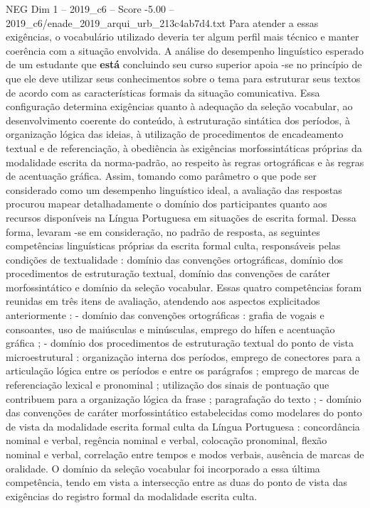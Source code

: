 \begin{textsample}{NEG Dim 1 – 2019\_c6 – Score -5.00 – 2019\_c6/enade\_2019\_arqui\_urb\_213c4ab7d4.txt}
Para atender a essas exigências, o vocabulário utilizado deveria ter algum perfil mais técnico e manter coerência com a situação envolvida.
A análise do desempenho linguístico esperado de um estudante que \textbf{está} concluindo seu curso superior apoia -se no princípio de que ele deve utilizar seus conhecimentos sobre o tema para estruturar seus textos de acordo com as características formais da situação comunicativa.
Essa configuração determina exigências quanto à adequação da seleção vocabular, ao desenvolvimento coerente do conteúdo, à estruturação sintática dos períodos, à organização lógica das ideias, à utilização de procedimentos de encadeamento textual e de referenciação, à obediência às exigências morfossintáticas próprias da modalidade escrita da norma-padrão, ao respeito às regras ortográficas e às regras de acentuação gráfica.
Assim, tomando como parâmetro o que pode ser considerado como um desempenho linguístico ideal, a avaliação das respostas procurou mapear detalhadamente o domínio dos participantes quanto aos recursos disponíveis na Língua Portuguesa em situações de escrita formal.
Dessa forma, levaram -se em consideração, no padrão de resposta, as seguintes competências linguísticas próprias da escrita formal culta, responsáveis pelas condições de textualidade : domínio das convenções ortográficas, domínio dos procedimentos de estruturação textual, domínio das convenções de caráter morfossintático e domínio da seleção vocabular.
Essas quatro competências foram reunidas em três itens de avaliação, atendendo aos aspectos explicitados anteriormente : - domínio das convenções ortográficas : grafia de vogais e consoantes, uso de maiúsculas e minúsculas, emprego do hífen e acentuação gráfica ; - domínio dos procedimentos de estruturação textual do ponto de vista microestrutural : organização interna dos períodos, emprego de conectores para a articulação lógica entre os períodos e entre os parágrafos ; emprego de marcas de referenciação lexical e pronominal ; utilização dos sinais de pontuação que contribuem para a organização lógica da frase ; paragrafação do texto ; - domínio das convenções de caráter morfossintático estabelecidas como modelares do ponto de vista da modalidade escrita formal culta da Língua Portuguesa : concordância nominal e verbal, regência nominal e verbal, colocação pronominal, flexão nominal e verbal, correlação entre tempos e modos verbais, ausência de marcas de oralidade.
O domínio da seleção vocabular foi incorporado a essa última competência, tendo em vista a intersecção entre as duas do ponto de vista das exigências do registro formal da modalidade escrita culta.

\end{textsample}
